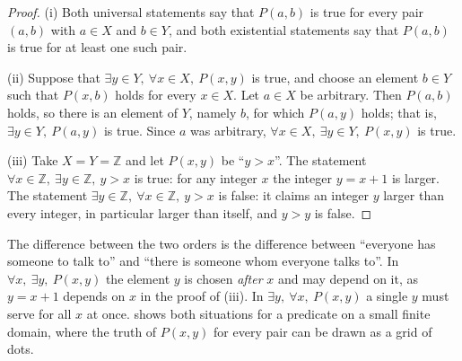 \begin{proof}
(i) Both universal statements say that $P(a,b)$ is true for every pair $(a,b)$ with $a\in X$ and $b\in Y$, and both existential statements say that $P(a,b)$ is true for at least one such pair.

(ii) Suppose that $\exists y\in Y,\ \forall x\in X,\ P(x,y)$ is true, and choose an element $b\in Y$ such that $P(x,b)$ holds for every $x\in X$. Let $a\in X$ be arbitrary. Then $P(a,b)$ holds, so there is an element of $Y$, namely $b$, for which $P(a,y)$ holds; that is, $\exists y\in Y,\ P(a,y)$ is true. Since $a$ was arbitrary, $\forall x\in X,\ \exists y\in Y,\ P(x,y)$ is true.

(iii) Take $X=Y=\mathbb Z$ and let $P(x,y)$ be ``$y>x$''. The statement $\forall x\in\mathbb Z,\ \exists y\in\mathbb Z,\ y>x$ is true: for any integer $x$ the integer $y=x+1$ is larger. The statement $\exists y\in\mathbb Z,\ \forall x\in\mathbb Z,\ y>x$ is false: it claims an integer $y$ larger than every integer, in particular larger than itself, and $y>y$ is false.
\end{proof}

The difference between the two orders is the difference between ``everyone has someone to talk to'' and ``there is someone whom everyone talks to''. In $\forall x,\ \exists y,\ P(x,y)$ the element $y$ is chosen \emph{after} $x$ and may depend on it, as $y=x+1$ depends on $x$ in the proof of (iii). In $\exists y,\ \forall x,\ P(x,y)$ a single $y$ must serve for all $x$ at once.  shows both situations for a predicate on a small finite domain, where the truth of $P(x,y)$ for every pair can be drawn as a grid of dots.

